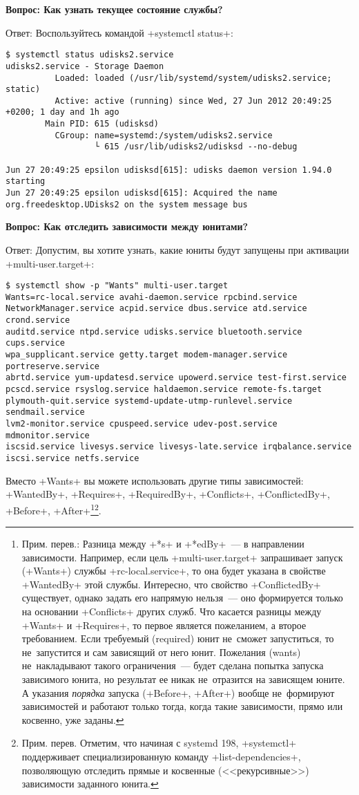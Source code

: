 \documentclass[10pt,oneside,a4paper]{article}
\newcommand{\qna}[1]{\medskip\par\textbf{Вопрос: #1}\par Ответ:}
\begin{document}
\qna{Как узнать текущее состояние службы?}
Воспользуйтесь командой +systemctl status+:
\begin{Verbatim}[fontsize=\small]
$ systemctl status udisks2.service
udisks2.service - Storage Daemon
          Loaded: loaded (/usr/lib/systemd/system/udisks2.service; static)
          Active: active (running) since Wed, 27 Jun 2012 20:49:25 +0200; 1 day and 1h ago
        Main PID: 615 (udisksd)
          CGroup: name=systemd:/system/udisks2.service
                  └ 615 /usr/lib/udisks2/udisksd --no-debug

Jun 27 20:49:25 epsilon udisksd[615]: udisks daemon version 1.94.0 starting
Jun 27 20:49:25 epsilon udisksd[615]: Acquired the name org.freedesktop.UDisks2 on the system message bus
\end{Verbatim}

\qna{Как отследить зависимости между юнитами?}
Допустим, вы хотите узнать, какие юниты будут запущены при активации
+multi-user.target+:
\begin{Verbatim}
$ systemctl show -p "Wants" multi-user.target
Wants=rc-local.service avahi-daemon.service rpcbind.service
NetworkManager.service acpid.service dbus.service atd.service crond.service
auditd.service ntpd.service udisks.service bluetooth.service cups.service
wpa_supplicant.service getty.target modem-manager.service portreserve.service
abrtd.service yum-updatesd.service upowerd.service test-first.service
pcscd.service rsyslog.service haldaemon.service remote-fs.target
plymouth-quit.service systemd-update-utmp-runlevel.service sendmail.service
lvm2-monitor.service cpuspeed.service udev-post.service mdmonitor.service
iscsid.service livesys.service livesys-late.service irqbalance.service
iscsi.service netfs.service	
\end{Verbatim}

Вместо +Wants+ вы можете использовать другие типы зависимостей: +WantedBy+, 
+Requires+, +RequiredBy+, +Conflicts+, +ConflictedBy+, +Before+,
+After+\footnote{\label{ftn:wants}Прим. перев.: Разница между +*s+ и +*edBy+~---
в направлении зависимости. Например, если цель +multi-user.target+ запрашивает
запуск (+Wants+) службы +rc-local.service+, то она будет
указана в свойстве +WantedBy+ этой службы. Интересно, что свойство
+ConflictedBy+ существует, однако задать его напрямую нельзя~--- оно
формируется только на основании +Conflicts+ других служб. Что касается
разницы между +Wants+ и +Requires+, то первое является пожеланием, а второе
требованием. Если требуемый (required) юнит не~сможет запуститься, то 
не~запустится и сам зависящий от него юнит. Пожелания (wants) не~накладывают
такого ограничения~--- будет сделана попытка запуска зависимого юнита, но
результат ее никак не~отразится на зависящем юните. А указания \emph{порядка}
запуска (+Before+, +After+) вообще не~формируют зависимостей и работают только
тогда, когда такие зависимости, прямо или косвенно, уже заданы.}\footnote{Прим.
перев. Отметим, что начиная с systemd 198, +systemctl+ поддерживает
специализированную команду +list-dependencies+, позволяющую отследить прямые и
косвенные (<<рекурсивные>>) зависимости заданного юнита.}.
\end{document}
